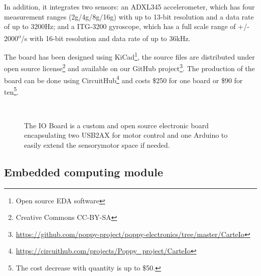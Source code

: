 In addition, it integrates two sensors: an ADXL345 accelerometer, which has four measurement ranges (2g/4g/8g/16g) with up to 13-bit resolution and a data rate of up to 3200Hz; and a ITG-3200 gyroscope, which has a full scale range of +/- 2000\textsuperscript{o}/s with 16-bit resolution and data rate of up to 36kHz.


The board has been designed using KiCad\footnote{Open source EDA software}, the source files are distributed under open source license\footnote{Creative Commons CC-BY-SA} and available on our GitHub project\footnote{\url{https://github.com/poppy-project/poppy-electronics/tree/master/CarteIo}}. The production of the board can be done using CircuitHub\footnote{\url{https://circuithub.com/projects/Poppy_project/CarteIo}} and costs \$250 for one board or \$90 for ten\footnote{The cost decrease with quantity is up to \$50.}.


\begin{figure}[p]
\centering
    \\
    \caption{The IO Board is a custom and open source electronic board encapsulating two USB2AX for motor control and one Arduino to easily extend the sensorymotor space if needed.}
    \label{fig:IO-board}
\end{figure}

\subsection{Embedded computing module} %

